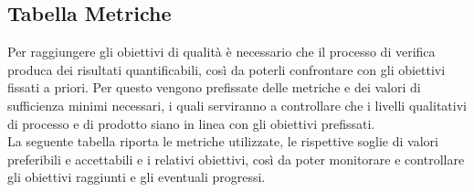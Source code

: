 \subsection{Tabella Metriche}
Per raggiungere gli obiettivi di qualità è necessario che il processo di verifica produca dei risultati quantificabili, così da poterli confrontare con gli obiettivi fissati a priori. Per questo vengono prefissate delle metriche e dei valori di sufficienza minimi necessari, i quali serviranno a controllare che i livelli qualitativi di processo e di prodotto siano in linea con gli obiettivi prefissati.\\La seguente tabella riporta le metriche utilizzate, le rispettive soglie di valori preferibili e accettabili e i relativi obiettivi, così da poter monitorare e controllare gli obiettivi raggiunti e gli eventuali progressi.

